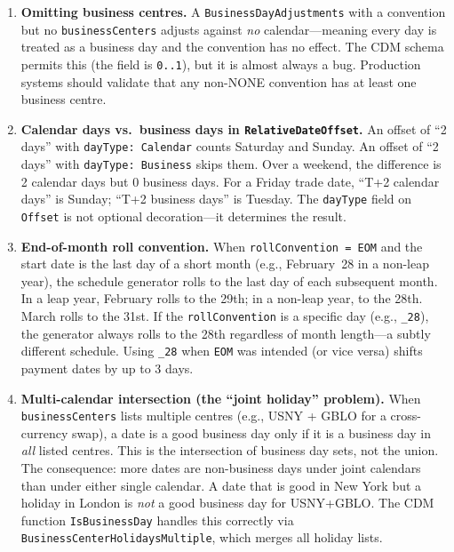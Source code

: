 \documentclass[11pt,a4paper]{article}
\begin{document}
\begin{enumerate}[nosep]

\item \textbf{Omitting business centres.} A \texttt{BusinessDayAdjustments} with a convention but no \texttt{businessCenters} adjusts against \emph{no} calendar---meaning every day is treated as a business day and the convention has no effect. The CDM schema permits this (the field is \texttt{0..1}), but it is almost always a bug. Production systems should validate that any non-NONE convention has at least one business centre.

\item \textbf{Calendar days vs.\ business days in \texttt{RelativeDateOffset}.} An offset of ``2 days'' with \texttt{dayType: Calendar} counts Saturday and Sunday. An offset of ``2 days'' with \texttt{dayType: Business} skips them. Over a weekend, the difference is 2 calendar days but 0 business days. For a Friday trade date, ``T+2 calendar days'' is Sunday; ``T+2 business days'' is Tuesday. The \texttt{dayType} field on \texttt{Offset} is not optional decoration---it determines the result.

\item \textbf{End-of-month roll convention.} When \texttt{rollConvention = EOM} and the start date is the last day of a short month (e.g., February~28 in a non-leap year), the schedule generator rolls to the last day of each subsequent month. In a leap year, February rolls to the 29th; in a non-leap year, to the 28th. March rolls to the 31st. If the \texttt{rollConvention} is a specific day (e.g., \texttt{\_28}), the generator always rolls to the 28th regardless of month length---a subtly different schedule. Using \texttt{\_28} when \texttt{EOM} was intended (or vice versa) shifts payment dates by up to 3 days.

\item \textbf{Multi-calendar intersection (the ``joint holiday'' problem).} When \texttt{businessCenters} lists multiple centres (e.g., USNY + GBLO for a cross-currency swap), a date is a good business day only if it is a business day in \emph{all} listed centres. This is the intersection of business day sets, not the union. The consequence: more dates are non-business days under joint calendars than under either single calendar. A date that is good in New York but a holiday in London is \emph{not} a good business day for USNY+GBLO. The CDM function \texttt{IsBusinessDay} handles this correctly via \texttt{BusinessCenterHolidaysMultiple}, which merges all holiday lists.


\end{enumerate}
\end{document}
